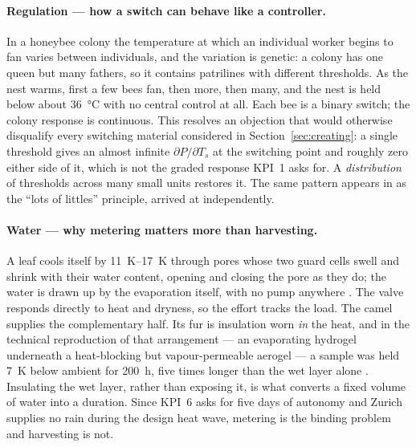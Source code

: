 \paragraph{Regulation --- how a switch can behave like a controller.} In a
honeybee colony the temperature at which an individual worker begins to fan
varies between individuals, and the variation is genetic: a colony has one
queen but many fathers, so it contains patrilines with different thresholds. As
the nest warms, first a few bees fan, then more, then many, and the nest is held
below about \qty{36}{\celsius} with no central control at all. Each bee is a
binary switch; the colony response is continuous. This resolves an objection
that would otherwise disqualify every switching material considered in
Section~\ref{sec:creating}: a single threshold gives an almost infinite
$\partial P/\partial T_s$ at the switching point and roughly zero either side of
it, which is not the graded response KPI~1 asks for. A \emph{distribution} of
thresholds across many small units restores it. The same pattern appears in
\textcite{hok2013} as the \enquote{lots of littles} principle, arrived at
independently.

\paragraph{Water --- why metering matters more than harvesting.} A leaf cools
itself by \qtyrange{11}{17}{\kelvin} through pores whose two guard cells swell
and shrink with their water content, opening and closing the pore as they do;
the water is drawn up by the evaporation itself, with no pump anywhere
\parencite[62--65]{hok2013}. The valve responds directly to heat and dryness, so
the effort tracks the load. The camel supplies the complementary half. Its fur
is insulation worn \emph{in} the heat, and in the technical reproduction of that
arrangement --- an evaporating hydrogel underneath a heat-blocking but
vapour-permeable aerogel --- a sample was held \qty{7}{\kelvin} below ambient for
\qty{200}{\hour}, five times longer than the wet layer alone
\parencite{asknature_camel}. Insulating the wet layer, rather than exposing it,
is what converts a fixed volume of water into a duration. Since KPI~6 asks for
five days of autonomy and Zurich supplies no rain during the design heat wave,
metering is the binding problem and harvesting is not.


